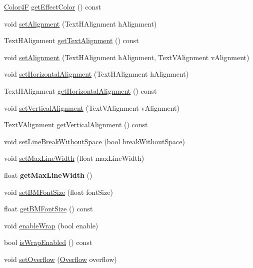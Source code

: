 \begin{DoxyCompactItemize}
\item 
\hyperlink{structColor4F}{Color4F} \hyperlink{classLabel_abd570f8a274713151c9a48d2b538a625}{get\+Effect\+Color} () const
\item 
void \hyperlink{classLabel_a2dd709f7a812d19d666b3b063534d34b}{set\+Alignment} (Text\+H\+Alignment h\+Alignment)
\item 
Text\+H\+Alignment \hyperlink{classLabel_aa23acedf74e98f051f47e76c3b1a088c}{get\+Text\+Alignment} () const
\item 
void \hyperlink{classLabel_a3fb693a7db81e6b313a2c9c871f8cf63}{set\+Alignment} (Text\+H\+Alignment h\+Alignment, Text\+V\+Alignment v\+Alignment)
\item 
void \hyperlink{classLabel_a53f1b4d0796e3e538f7e40f1f5badbb1}{set\+Horizontal\+Alignment} (Text\+H\+Alignment h\+Alignment)
\item 
Text\+H\+Alignment \hyperlink{classLabel_ae7bcc1f4a628d8d3ab354d80b97cf3e1}{get\+Horizontal\+Alignment} () const
\item 
void \hyperlink{classLabel_a97b358d0917e0a70b16146ec3a105d42}{set\+Vertical\+Alignment} (Text\+V\+Alignment v\+Alignment)
\item 
Text\+V\+Alignment \hyperlink{classLabel_ab3981bcbc2730ddda1cbb68a0faf20ac}{get\+Vertical\+Alignment} () const
\item 
void \hyperlink{classLabel_aa6ea9a4b8d81b4c14e44fdd3a862073f}{set\+Line\+Break\+Without\+Space} (bool break\+Without\+Space)
\item 
void \hyperlink{classLabel_ad7bd1d7f371a961f4c03c36ee31357b6}{set\+Max\+Line\+Width} (float max\+Line\+Width)
\item 
\mbox{\label{classLabel_a35f9703a7000aef536bef05f3d853358}} 
float {\bfseries get\+Max\+Line\+Width} ()
\item 
void \hyperlink{classLabel_a3d5451ed32ff33ef8de937ace917531d}{set\+B\+M\+Font\+Size} (float font\+Size)
\item 
float \hyperlink{classLabel_a296763fd55fbde90fdec27bbc563a119}{get\+B\+M\+Font\+Size} () const
\item 
void \hyperlink{classLabel_aff268f12033618164c424d7fd24bc94f}{enable\+Wrap} (bool enable)
\item 
bool \hyperlink{classLabel_a1d6375fbdbcea18a4055f53520ea5dd1}{is\+Wrap\+Enabled} () const
\item 
void \hyperlink{classLabel_a50e5693d5ad8c240aa7178a000ad5f20}{set\+Overflow} (\hyperlink{classLabel_af7d31998ea743e8ca64eb1a983fa6a4c}{Overflow} overflow)

\end{DoxyCompactItemize}
